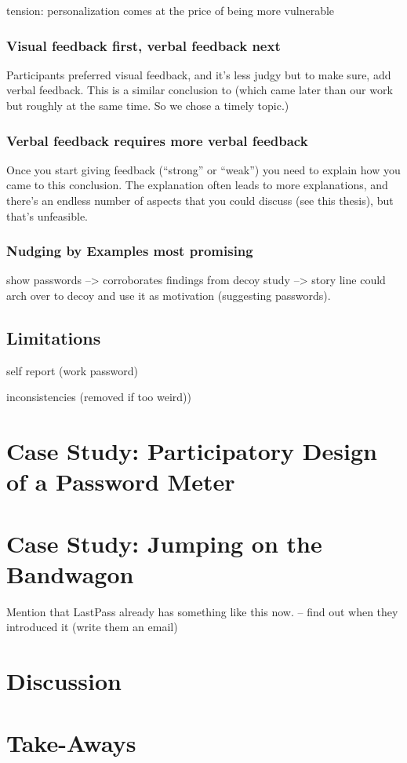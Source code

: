 tension: personalization comes at the price of being more vulnerable
\subsubsection{Visual feedback first, verbal feedback next}
Participants preferred visual feedback, and it's less judgy but to make sure, add verbal feedback. This is a similar conclusion to \cite{Ur2017DataDrivenPWMeter} (which came later than our work but roughly at the same time. So we chose a timely topic.)

\subsubsection{Verbal feedback requires more verbal feedback}
Once you start giving feedback (``strong'' or ``weak'') you need to explain how you came to this conclusion. The explanation often leads to more explanations, and there's an endless number of aspects that you could discuss (see this thesis), but that's unfeasible. 


\subsubsection{Nudging by Examples most promising}
show passwords --> corroborates findings from decoy study --> story line could arch over to decoy and use it as motivation (suggesting passwords). 


\subsection{Limitations}
self report (work password) 

inconsistencies (removed if too weird))

\section{Case Study: Participatory Design of a Password Meter}

\section{Case Study: Jumping on the Bandwagon}
Mention that LastPass already has something like this now. -- find out when they introduced it (write them an email) 

\section{Discussion}

\section{Take-Aways}

